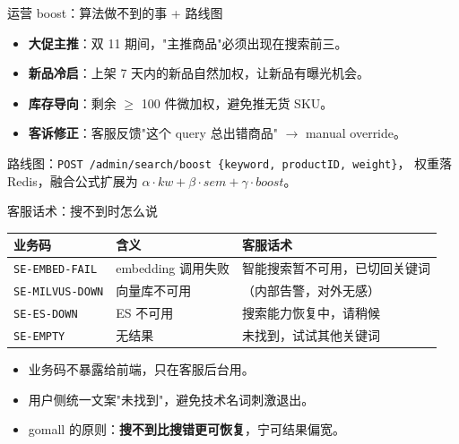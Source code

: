 \begin{frame}{运营 boost：算法做不到的事 + 路线图}
\begin{itemize}
  \item \textbf{大促主推}：双 11 期间，"主推商品"必须出现在搜索前三。
  \item \textbf{新品冷启}：上架 7 天内的新品自然加权，让新品有曝光机会。
  \item \textbf{库存导向}：剩余 $\geq$ 100 件微加权，避免推无货 SKU。
  \item \textbf{客诉修正}：客服反馈"这个 query 总出错商品" $\to$ manual override。
\end{itemize}
\vspace{2mm}
路线图：\texttt{POST /admin/search/boost \{keyword, productID, weight\}}，
权重落 Redis，融合公式扩展为 \texttt{$\alpha \cdot kw + \beta \cdot sem + \gamma \cdot boost$}。
\end{frame}

\begin{frame}{客服话术：搜不到时怎么说}
\begin{tabular}{@{}lll@{}}
\toprule
业务码 & 含义 & 客服话术 \\
\midrule
\texttt{SE-EMBED-FAIL} & embedding 调用失败 & 智能搜索暂不可用，已切回关键词 \\
\texttt{SE-MILVUS-DOWN} & 向量库不可用     & （内部告警，对外无感）        \\
\texttt{SE-ES-DOWN}     & ES 不可用         & 搜索能力恢复中，请稍候           \\
\texttt{SE-EMPTY}       & 无结果           & 未找到，试试其他关键词           \\
\bottomrule
\end{tabular}
\vspace{3mm}
\begin{itemize}
  \item 业务码不暴露给前端，只在客服后台用。
  \item 用户侧统一文案"未找到"，避免技术名词刺激退出。
  \item gomall 的原则：\textbf{搜不到比搜错更可恢复}，宁可结果偏宽。
\end{itemize}
\end{frame}

